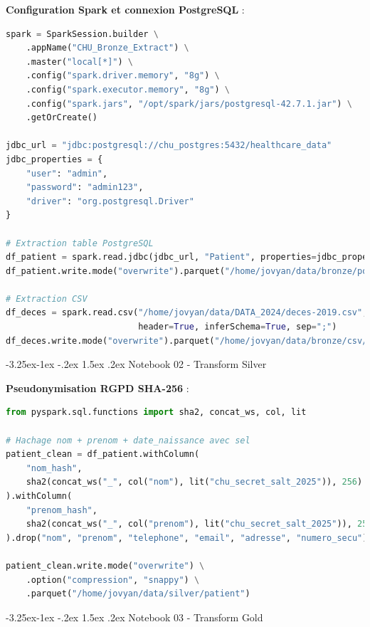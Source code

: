 \documentclass[12pt,a4paper]{article}
\makeatletter
\renewcommand\subsection{\@startsection{subsection}{2}{\z@}%
    {-3.25ex\@plus -1ex \@minus -.2ex}%
    {1.5ex \@plus .2ex}%
    {\normalfont\large\bfseries\color{blue!50!black}}}
\makeatother
\begin{document}
\textbf{Configuration Spark et connexion PostgreSQL} :
\begin{lstlisting}[language=Python, basicstyle=\tiny\ttfamily, breaklines=true]
spark = SparkSession.builder \
    .appName("CHU_Bronze_Extract") \
    .master("local[*]") \
    .config("spark.driver.memory", "8g") \
    .config("spark.executor.memory", "8g") \
    .config("spark.jars", "/opt/spark/jars/postgresql-42.7.1.jar") \
    .getOrCreate()

jdbc_url = "jdbc:postgresql://chu_postgres:5432/healthcare_data"
jdbc_properties = {
    "user": "admin",
    "password": "admin123",
    "driver": "org.postgresql.Driver"
}

# Extraction table PostgreSQL
df_patient = spark.read.jdbc(jdbc_url, "Patient", properties=jdbc_properties)
df_patient.write.mode("overwrite").parquet("/home/jovyan/data/bronze/postgres/Patient")

# Extraction CSV
df_deces = spark.read.csv("/home/jovyan/data/DATA_2024/deces-2019.csv",
                          header=True, inferSchema=True, sep=";")
df_deces.write.mode("overwrite").parquet("/home/jovyan/data/bronze/csv/deces")
\end{lstlisting}

\subsection{Notebook 02 - Transform Silver}

\textbf{Pseudonymisation RGPD SHA-256} :
\begin{lstlisting}[language=Python, basicstyle=\tiny\ttfamily, breaklines=true]
from pyspark.sql.functions import sha2, concat_ws, col, lit

# Hachage nom + prenom + date_naissance avec sel
patient_clean = df_patient.withColumn(
    "nom_hash",
    sha2(concat_ws("_", col("nom"), lit("chu_secret_salt_2025")), 256)
).withColumn(
    "prenom_hash",
    sha2(concat_ws("_", col("prenom"), lit("chu_secret_salt_2025")), 256)
).drop("nom", "prenom", "telephone", "email", "adresse", "numero_secu")

patient_clean.write.mode("overwrite") \
    .option("compression", "snappy") \
    .parquet("/home/jovyan/data/silver/patient")
\end{lstlisting}

\subsection{Notebook 03 - Transform Gold}
\end{document}
